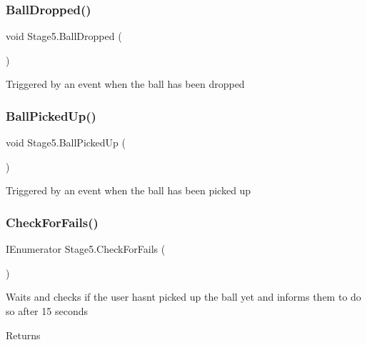 \subsubsection{\texorpdfstring{Ball\+Dropped()}{BallDropped()}}
{\footnotesize\ttfamily void Stage5.\+Ball\+Dropped (\begin{DoxyParamCaption}{ }\end{DoxyParamCaption})\hspace{0.3cm}{\ttfamily [private]}}



Triggered by an event when the ball has been dropped 

\mbox{\label{class_stage5_a06516c2e958f8fea48f5d88924649ba4}} 
\subsubsection{\texorpdfstring{Ball\+Picked\+Up()}{BallPickedUp()}}
{\footnotesize\ttfamily void Stage5.\+Ball\+Picked\+Up (\begin{DoxyParamCaption}{ }\end{DoxyParamCaption})\hspace{0.3cm}{\ttfamily [private]}}



Triggered by an event when the ball has been picked up 

\mbox{\label{class_stage5_ab2e381c47a40f2726df0579f07bbb7fa}} 
\subsubsection{\texorpdfstring{Check\+For\+Fails()}{CheckForFails()}}
{\footnotesize\ttfamily I\+Enumerator Stage5.\+Check\+For\+Fails (\begin{DoxyParamCaption}{ }\end{DoxyParamCaption})\hspace{0.3cm}{\ttfamily [private]}}



Waits and checks if the user hasn\textquotesingle{}t picked up the ball yet and informs them to do so after 15 seconds 

\begin{DoxyReturn}{Returns}

\end{DoxyReturn}
\mbox{\label{class_stage5_a1cdfae544606e8537d2dd31e5ed2ea83}} 
